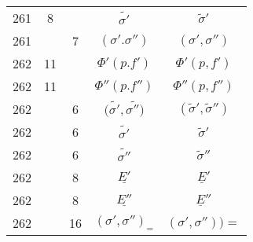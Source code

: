 \documentclass[a4paper,11pt]{article}
\numberwithin{equation}{section}
\begin{document}
\begin{center}
\begin{tabular}{|c|c|c|c|c|}
    261 & \hphantom{0}8 & & $\widetilde{ \sigma' }$ & $\widetilde{ \sigma }'$ \\
    261 & & \hphantom{0}7 & $( \sigma'. \sigma'' )$ & $( \sigma', \sigma'' )$ \\
    262 & 11 & & $\Phi'( p. f' )$ & $\Phi'( p, f' )$ \\
    262 & 11 & & $\Phi''( p. f'' )$ & $\Phi''( p, f'' )$ \\
    262 & & \hphantom{0}6 & $( \widetilde{ \sigma' }, \widetilde{ \sigma'' ) }$
    & $( \widetilde{ \sigma }', \widetilde{ \sigma }'' )$ \\
    262 & & \hphantom{0}6 & $\widetilde{ \sigma' }$ & $\widetilde{ \sigma }'$ \\
    262 & & \hphantom{0}6 & $\widetilde{ \sigma'' }$ & $\widetilde{ \sigma }''$ \\
    262 & & \hphantom{0}8 & $\underline{ E' }$ & $\underline{ E }'$ \\
    262 & & \hphantom{0}8 & $\underline{ E'' }$ & $\underline{ E }''$ \\
    262 & & 16 & $( \sigma', \sigma'' )_{ = }$
           & $( \sigma', \sigma'' ) \big) =$ \\
    \hline
  \end{tabular}





  \newpage


\end{center}
\end{document}
